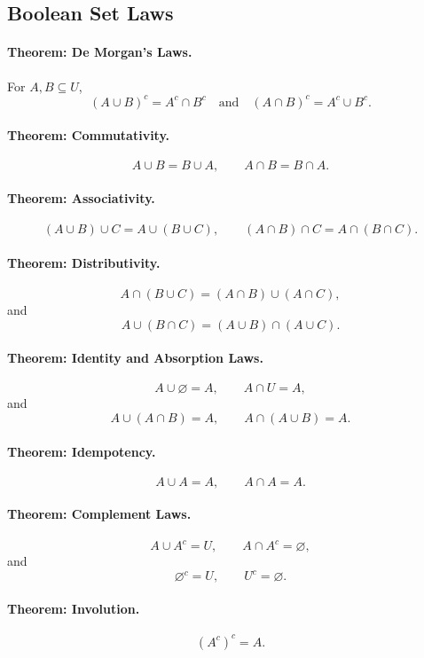 \subsection*{Boolean Set Laws}

\paragraph{Theorem: De Morgan's Laws.}
For \(A,B\subseteq U\),
\[
  (A\cup B)^c=A^c\cap B^c
  \quad\text{and}\quad
  (A\cap B)^c=A^c\cup B^c.
\]

\paragraph{Theorem: Commutativity.}
\[
  A\cup B=B\cup A,
  \qquad
  A\cap B=B\cap A.
\]

\paragraph{Theorem: Associativity.}
\[
  (A\cup B)\cup C=A\cup(B\cup C),
  \qquad
  (A\cap B)\cap C=A\cap(B\cap C).
\]

\paragraph{Theorem: Distributivity.}
\[
  A\cap(B\cup C)=(A\cap B)\cup(A\cap C),
\]
and
\[
  A\cup(B\cap C)=(A\cup B)\cap(A\cup C).
\]

\paragraph{Theorem: Identity and Absorption Laws.}
\[
  A\cup\varnothing=A,
  \qquad
  A\cap U=A,
\]
and
\[
  A\cup(A\cap B)=A,
  \qquad
  A\cap(A\cup B)=A.
\]

\paragraph{Theorem: Idempotency.}
\[
  A\cup A=A,
  \qquad
  A\cap A=A.
\]

\paragraph{Theorem: Complement Laws.}
\[
  A\cup A^c=U,
  \qquad
  A\cap A^c=\varnothing,
\]
and
\[
  \varnothing^c=U,
  \qquad
  U^c=\varnothing.
\]

\paragraph{Theorem: Involution.}
\[
  (A^c)^c=A.
\]

